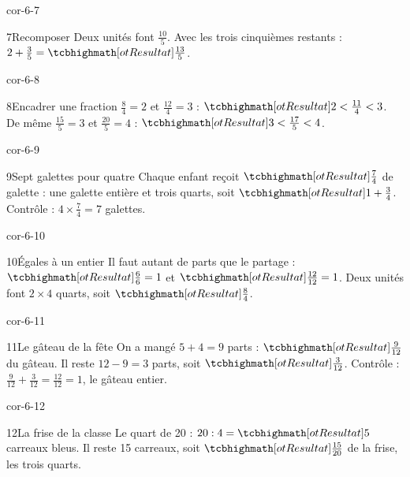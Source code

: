 \begin{blocLivre}{cor-6-7}\begin{corrige}{7}{Recomposer}
Deux unités font $\frac{10}5$. Avec les trois cinquièmes restants : $2+\frac35=\res{\frac{13}5}$.
\end{corrige}\end{blocLivre}
\begin{blocLivre}{cor-6-8}\begin{corrige}{8}{Encadrer une fraction}
$\frac84=2$ et $\frac{12}4=3$ : $\res{2<\frac{11}4<3}$. De même $\frac{15}5=3$ et $\frac{20}5=4$ : $\res{3<\frac{17}5<4}$.
\end{corrige}\end{blocLivre}
\begin{blocLivre}{cor-6-9}\begin{corrige}{9}{Sept galettes pour quatre}
Chaque enfant reçoit $\res{\frac74}$ de galette : une galette entière et trois quarts, soit $\res{1+\frac34}$. Contrôle : $4\times\frac74=7$ galettes.
\end{corrige}\end{blocLivre}
\begin{blocLivre}{cor-6-10}\begin{corrige}{10}{Égales à un entier}
Il faut autant de parts que le partage : $\res{\frac66=1}$ et $\res{\frac{12}{12}=1}$. Deux unités font $2\times4$ quarts, soit $\res{\frac84}$.
\end{corrige}\end{blocLivre}
\begin{blocLivre}{cor-6-11}\begin{corrige}{11}{Le gâteau de la fête}
On a mangé $5+4=9$ parts : $\res{\frac9{12}}$ du gâteau. Il reste $12-9=3$ parts, soit $\res{\frac3{12}}$. Contrôle : $\frac9{12}+\frac3{12}=\frac{12}{12}=1$, le gâteau entier.
\label{fig-cor-6-11}
\end{corrige}\end{blocLivre}
\begin{blocLivre}{cor-6-12}\begin{corrige}{12}{La frise de la classe}
Le quart de 20 : $20:4=\res5$ carreaux bleus. Il reste 15 carreaux, soit $\res{\frac{15}{20}}$ de la frise, les trois quarts.
\label{fig-cor-6-12}
\end{corrige}\end{blocLivre}
